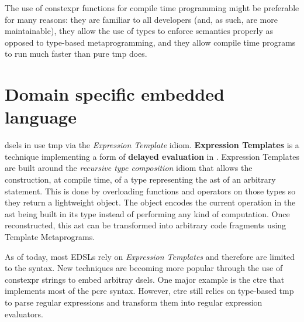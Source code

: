 \documentclass[../main]{subfiles}
\begin{document}
The use of \gls{constexpr} functions for compile time programming might be
preferable for many reasons: they are familiar to all \cpp developers
(and, as such, are more maintainable), they allow the use of types to enforce
semantics properly as opposed to type-based metaprogramming, and they allow
compile time programs to run much faster than pure \gls{tmp} does.

\section{
  Domain specific embedded language
}
\label{lbl:expression-level-metaprogramming}



\glspl{dsel} in \cpp use \gls{tmp} via the \textit{Expression Template} idiom.
\textbf{Expression Templates} \cite{veldhuizen:1995,vandevoorde:2002} is a
technique implementing a form of \textbf{delayed evaluation} in
\cpp \cite{spinellis:2001}. Expression Templates are built around the
\textit{recursive type composition} idiom \cite{jarvi:1998} that allows the
construction, at compile time, of a type representing the \gls{ast}
of an arbitrary statement. This is done by overloading functions and operators
on those types so they return a lightweight object.
The object encodes the current operation in the \gls{ast}
being built in its type instead of performing any kind of computation.
Once reconstructed, this \gls{ast} can be transformed into arbitrary code fragments
using Template Metaprograms.

As of today, most \cpp EDSLs rely on \textit{Expression Templates} and therefore
are limited to the \cpp syntax. New techniques are becoming more popular through
the use of \gls{constexpr} strings to embed arbitray
\glspl{dsel}. One major example is the \gls{ctre} \cite{ctre}
that implements most of the \gls{pcre} syntax.
However, \gls{ctre} still relies on type-based \gls{tmp} to parse
regular expressions and transform them into regular expression evaluators.
\end{document}
